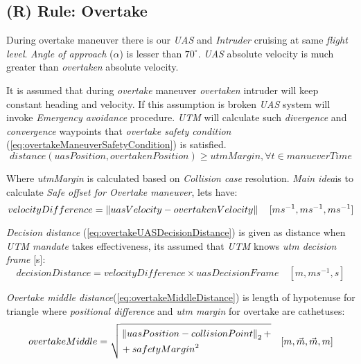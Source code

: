 \subsection{(R) Rule: Overtake}\label{sec:ruleOvertake}
\noindent During overtake maneuver there is our \emph{UAS} and \emph{Intruder} cruising at same \emph{flight level}. \emph{Angle of approach} ($\alpha$) is lesser than $70^\circ$. \emph{UAS} absolute velocity is much greater than \emph{overtaken} absolute velocity. 

It is assumed that during \emph{overtake} maneuver \emph{overtaken} intruder will keep constant heading and velocity. If this assumption is broken \emph{UAS} system will invoke \emph{Emergency avoidance} procedure. \emph{UTM} will calculate such \emph{divergence} and \emph{convergence} waypoints that \emph{overtake safety condition} (\ref{eq:overtakeManeuverSafetyCondition}) is satisfied.
\begin{equation}\label{eq:overtakeManeuverSafetyCondition}
        distance(uasPosition,overtakenPosition) \ge utmMargin, \forall t\in manueverTime
\end{equation}

\noindent Where \emph{utmMargin} is calculated based on \emph{Collision case} resolution. \emph{Main idea}is to calculate \emph{Safe offset for Overtake maneuver}, lets have:
\begin{equation}\label{eq:overtakeVelocityDifference}
    velocityDifference=\left\lVert uasVelocity-overtakenVelocity\right\rVert\quad [ms^{-1},ms^{-1},ms^{-1}]
\end{equation}

\noindent \emph{Decision distance} (\ref{eq:overtakeUASDecisionDistance}) is given as distance when \emph{UTM mandate} takes effectiveness, its assumed that \emph{UTM} knows \emph{utm decision frame} [s]:
\begin{equation}\label{eq:overtakeUASDecisionDistance}
    decisionDistance =  velocityDifference \times uasDecisionFrame\quad [m,ms^{-1},s]    
\end{equation}

\noindent \emph{Overtake middle distance}(\ref{eq:overtakeMiddleDistance}) is length of hypotenuse for triangle where \emph{positional difference} and \emph{utm margin} for overtake are cathetuses:
\begin{equation}\label{eq:overtakeMiddleDistance}
    overtakeMiddle=\sqrt{\begin{aligned}&\left\lVert uasPosition - collisionPoint\right\rVert_2+\\ &+ safetyMargin^2 \end{aligned}}\quad [m,\vec{m},\vec{m},m]
\end{equation}


